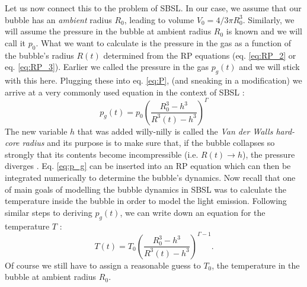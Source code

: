 \documentclass[rmp,aps,nofootinbib,superscriptaddress,floatfix]{revtex4-2}
\begin{document}
Let us now connect this to the problem of SBSL. In our case, we assume that our bubble has an \emph{ambient} radius $R_0$, leading to volume $V_0 =  4/3 \pi R_0^3$. Similarly, we will assume the pressure in the bubble at ambient radius $R_0$ is known and we will call it $p_0$. What we want to calculate is the pressure in the gas as a function of the bubble's radius $R(t)$ determined from the RP equations (eq. \ref{eq:RP_2} or eq. \ref{eq:RP_3}). Earlier we called the pressure in the gas $p_g(t)$ and we will stick with this here. Plugging these into eq. \ref{eq:P}, (and sneaking in a modification) we arrive at a very commonly used equation in the context of SBSL \cite{brenner2002single,lofstedt1995sonoluminescing,barber1997defining,lofstedt1993toward}:
\begin{equation}
    p_g(t) = p_0 \left( \frac{R_0^3-h^3}{R^3(t)-h^3} \right)^ \Gamma
    \label{eq:p_g}
\end{equation}
The new variable $h$ that was added willy-nilly is called the \emph{Van der Walls hard-core radius} and its purpose is to make sure that, if the bubble collapses so strongly that its contents become incompressible (i.e. $R(t)\rightarrow h$), the pressure diverges \cite{lofstedt1993toward,brenner2002single}. Eq. \ref{eq:p_g} can be inserted into an RP equation which can then be integrated numerically to determine the bubble's dynamics. Now recall that one of main goals of modelling the bubble dynamics in SBSL was to calculate the temperature inside the bubble in order to model the light emission. Following similar steps to deriving $p_g(t)$, we can write down an equation for the temperature $T$ \cite{barber1997defining,brenner2002single}:
\begin{equation}
    T(t) = T_0 \left( \frac{R_0^3-h^3}{R^3(t)-h^3} \right)^ {\Gamma-1}.
    \label{eq:T(t)}
\end{equation}
Of course we still have to assign a reasonable guess to $T_0$, the temperature in the bubble at ambient radius $R_0$.
\end{document}
